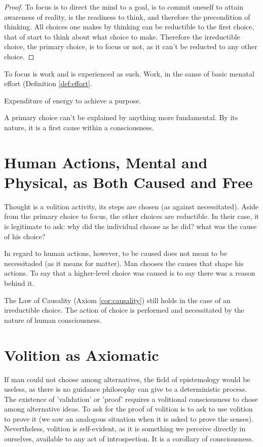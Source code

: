             \begin{proof}
                To focus is to direct the mind to a goal, is to commit oneself to attain awareness of reality, is the readiness to think, and therefore the precondition of thinking. All choices one makes by thinking can be reductible to the first choice, that of start to think about what choice to make. Therefore the irreductible choice, the primary choice, is to focus or not, as it can't be reducted to any other choice.
            \end{proof}

        To focus is work and is experienced as such. Work, in the sanse of basic menatal effort (Definition \ref{def:effort}.

            \begin{definition}[Effort]
            \label{def:effort}
                Expenditure of energy to achieve a purpose.
            \end{definition}

        A primary choice can't be explained by anything more fundamental. By its nature, it is a first cause within a consciousness.

    \section{Human Actions, Mental and Physical, as Both Caused and Free}
    
        Thought is a volition activity, its steps are chosen (as against necessitated). Aside from the primary choice to focus, the other choices are reductible. In their case, it is legitimate to ask: why did the individual choose as he did? what was the cause of his choice?

        In regard to human actions, however, to be caused does not mean to be necessitaded (as it means for matter). Man chooses the causes that shape his actions. To say that a higher-level choice was caused is to say there was a reason behind it.

        The Law of Causality (Axiom \ref{cor:causality}) still holds in the case of an irreductible choice. The action of choice is performed and necessitated by the nature of human consciousness.


    \section{Volition as Axiomatic}

        If man could not choose among alternatives, the field of epistemology would be useless, as there is no guidance philosophy can give to a deterministic process. The existence of 'validation' or 'proof' requires a volitional consciousness to chose among alternative ideas. To ask for the proof of volition is to ask to use volition to prove it (we saw an analogous situation when it is asked to prove the senses). Nevertheless, volition is self-evident, as it is something we perceive directly in ourselves, available to any act of introspection. It is a corollary of consciousness.

